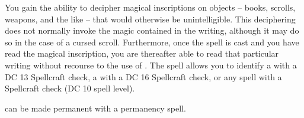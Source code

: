 \spelldur{\durlong}
\begin{spelleffect}
You gain the ability to decipher magical inscriptions on objects -- books, scrolls, weapons, and the like -- that would otherwise be unintelligible. This deciphering does not normally invoke the magic contained in the writing, although it may do so in the case of a cursed scroll. Furthermore, once the spell is cast and you have read the magical inscription, you are thereafter able to read that particular writing without recourse to the use of . The spell allows you to identify a  with a DC 13 Spellcraft check, a  with a DC 16 Spellcraft check, or any  spell with a Spellcraft check (DC 10 \add spell level).
\end{spelleffect}
\begin{spellnotes}
 can be made permanent with a permanency spell.
\end{spellnotes}

